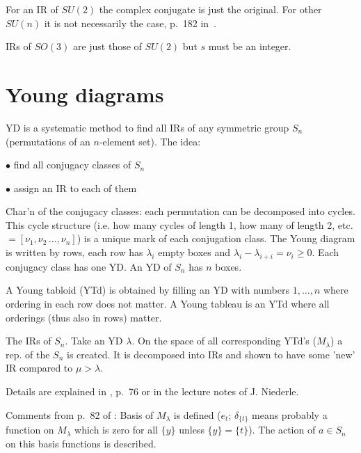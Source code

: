 For an IR of $SU(2)$ the complex conjugate is just the original. For other
$SU(n)$ it is not necessarily the case, p.~182 in~\cite{sternberg}.

IRs of $SO(3)$ are just those of $SU(2)$ but $s$ must be an integer.




\section{Young diagrams}

YD is a systematic method to find all IRs of any symmetric group $S_n$
(permutations of an $n$-element set). The idea:

\item{$\bullet$} find all conjugacy classes of $S_n$

\item{$\bullet$} assign an IR to each of them

\noindent
Char'n of the conjugacy classes: each permutation can be decomposed into
cycles. This cycle structure (i.e. how many cycles of length 1, how many of
length 2, etc. $=[\nu_1,\nu_2\,\ldots,\nu_n]$) is a unique mark of each
conjugation class. The Young diagram is written by rows, each row has
$\lambda_i$ empty boxes and $\lambda_i-\lambda_{i+i}=\nu_i\ge 0$. Each
conjugacy class has one YD. An YD of $S_n$ has $n$ boxes.

A Young tabloid (YTd) is obtained by filling an YD with numbers $1,\ldots,n$ where
ordering in each row does not matter. A Young tableau is an YTd where all
orderings (thus also in rows) matter.

The IRs of $S_n$. Take an YD $\lambda$. On the space of all corresponding
YTd's ($M_\lambda$) a rep. of the $S_n$ is created. It is decomposed into IRs
and shown to have some 'new' IR compared to $\mu>\lambda$.


Details are explained in \cite{sternberg}, p.~76 or in the lecture notes of
J. Niederle.  


Comments from p.~82 of \cite{sternberg}:
Basis of $M_\lambda$ is defined ($e_t$; $\delta_{\{t\}}$ means probably a function on
$M_\lambda$ which is zero for all $\{y\}$ unless $\{y\}=\{t\}$). The action of
$a\in S_n$ on this basis functions is described.





